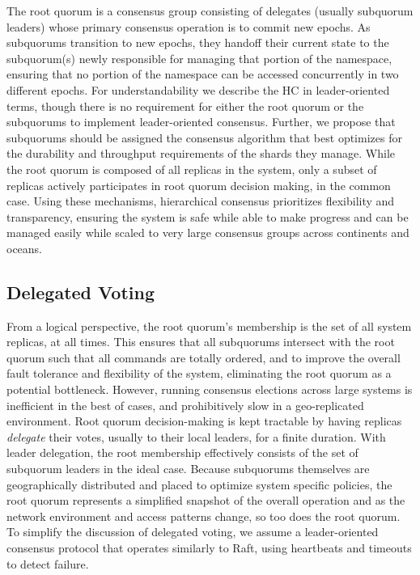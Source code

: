 \documentclass[10pt,conference]{IEEEtran}
\newcommand{\hc}{hierarchical consensus\xspace}
\newcommand{\sub}{subquorum\xspace}
\newcommand{\subs}{subquorums\xspace}
\newcommand{\roo}{root quorum\xspace}
\begin{document}
The \roo is a consensus group consisting of delegates (usually subquorum leaders) whose
primary consensus operation is to commit new epochs.
As \subs transition to new epochs, they handoff their current state to the \sub(s)
newly responsible for managing that portion of the namespace, ensuring that no portion
of the namespace can be accessed concurrently in two different epochs.
For understandability we describe the HC in leader-oriented terms, though there is no
requirement for either the \roo or the \subs to implement leader-oriented consensus.
Further, we propose that \subs should be assigned the consensus algorithm that best
optimizes for the durability and throughput requirements of the shards they manage.
While the root quorum is composed of all replicas in the system, only a subset of
replicas actively participates in root quorum decision making, in the common case.
Using these mechanisms, \hc prioritizes flexibility and transparency, ensuring the
system is safe while able to make progress and can be managed easily while scaled to
very large consensus groups across continents and oceans.

\subsection{Delegated Voting}
\label{section:delegation}

From a logical perspective, the \roo's membership is the set of all system replicas, at
all times.
This ensures that all \subs intersect with the \roo such that all commands are totally
ordered, and to improve the overall fault tolerance and flexibility of the system,
eliminating the \roo as a potential bottleneck.
However, running consensus elections across large systems is inefficient in the best of
cases, and prohibitively slow in a geo-replicated environment.
Root quorum decision-making is kept tractable by having replicas \emph{delegate} their
votes, usually to their local leaders, for a finite duration.
With leader delegation, the root membership effectively consists of the set of \sub
leaders in the ideal case.
Because \subs themselves are geographically distributed and placed to optimize system
specific policies, the \roo represents a simplified snapshot of the overall operation
and as the network environment and access patterns change, so too does the \roo.
To simplify the discussion of delegated voting, we assume a leader-oriented consensus
protocol that operates similarly to Raft, using heartbeats and timeouts to detect
failure.
\end{document}
